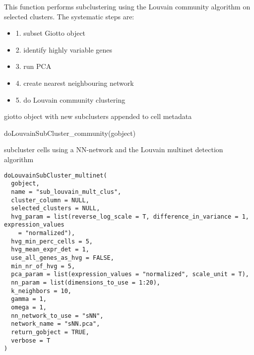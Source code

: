 \documentclass[a4paper]{book}
\begin{document}
%
\begin{Details}\relax
This function performs subclustering using the Louvain community algorithm on selected clusters.
The systematic steps are:
\begin{itemize}

\item{} 1. subset Giotto object
\item{} 2. identify highly variable genes
\item{} 3. run PCA
\item{} 4. create nearest neighbouring network
\item{} 5. do Louvain community clustering

\end{itemize}

\end{Details}
%
\begin{Value}
giotto object with new subclusters appended to cell metadata
\end{Value}
%
\begin{SeeAlso}\relax
{}
\end{SeeAlso}
%
\begin{Examples}
\begin{ExampleCode}
    doLouvainSubCluster_community(gobject)
\end{ExampleCode}
\end{Examples}
%
\begin{Description}\relax
subcluster cells using a NN-network and the Louvain multinet detection algorithm
\end{Description}
%
\begin{Usage}
\begin{verbatim}
doLouvainSubCluster_multinet(
  gobject,
  name = "sub_louvain_mult_clus",
  cluster_column = NULL,
  selected_clusters = NULL,
  hvg_param = list(reverse_log_scale = T, difference_in_variance = 1, expression_values
    = "normalized"),
  hvg_min_perc_cells = 5,
  hvg_mean_expr_det = 1,
  use_all_genes_as_hvg = FALSE,
  min_nr_of_hvg = 5,
  pca_param = list(expression_values = "normalized", scale_unit = T),
  nn_param = list(dimensions_to_use = 1:20),
  k_neighbors = 10,
  gamma = 1,
  omega = 1,
  nn_network_to_use = "sNN",
  network_name = "sNN.pca",
  return_gobject = TRUE,
  verbose = T
)
\end{verbatim}
\end{Usage}
\end{document}

